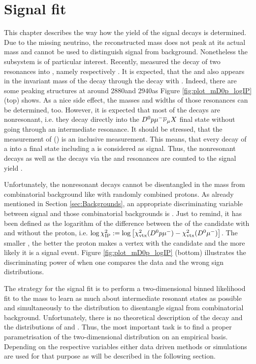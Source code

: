 \chapter{Signal fit}
\label{sec:Signalfit}
This chapter describes the way how the yield \NDp of the signal decays \LbToDpmunuX is determined.
Due to the missing neutrino, the reconstructed \Lb mass does not peak at its actual mass and cannot be used to distinguish signal from background.
Nonetheless the \Dz\proton subsystem is of particular interest.
Recently, \babar measured the decay of two \Lc resonances into \Dz\proton, namely \decay{\LcResI}{\Dz\proton} respectively \decay{\LcResII}{\Dz\proton} \cite{BaBar_D0p}.
It is expected, that the \LcResI and \LcResII also appears in the invariant \Dz\proton mass of the decay \LbToDpmunuX through the decay  with .
Indeed, there are some peaking structures at \MDp around 2880\mev and 2940\mev as Figure \ref{fig:plot_mD0p_logIP} (top) shows.
As a nice side effect, the masses and widths of those resonances can be determined, too.
However, it is expected that most of the \LbToDpmunuX decays are nonresonant, i.e. they decay directly into the ${{D}^0}{p}{\mu^-}{{\overline{\nu}}_\mu} X$ final state without going through an intermediate resonance.
It should be stressed, that the measurement of \BR(\LbToDpmunuX) is an inclusive measurement.
This means, that every decay of a \Lb into a final state including a \Dz\proton\mun\neumb is considered as signal.
Thus, the nonresonant \Lb decays as well as the decays via the \LcResI and \LcResII resonances are counted to the signal yield \NDp.

Unfortunately, the nonresonant \Lb decays cannot be disentangled in the \Dz\proton mass from combinatorial background like \BToDmunuX with randomly combined protons.
As already mentioned in Section \ref{sec:Backgrounds}, an appropriate discriminating variable between signal and those combinatorial backgrounds is \logIP.
Just to remind, it has been defined as the logarithm of the difference between the \chisqvtx of the \Dz\mun candidate with and without the proton, i.e. $\log \chi^2_{\text{IP}} := \log\left[\chi^2_{\rm vtx}({{D}^0}{p}{\mu^-}) - \chi^2_{\rm vtx}({{D}^0}{\mu^-})\right]$.
The smaller \logIP, the better the proton makes a vertex with the \Dz\mun candidate and the more likely it is a \LbToDpmunuX signal event.
Figure \ref{fig:plot_mD0p_logIP} (bottom) illustrates the discriminating power of \logIP when one compares the data and the wrong sign distributions.

The strategy for the signal fit is to perform a two-dimensional binned likelihood fit to the \Dz\proton mass to learn as much about intermediate resonant states as possible and simultaneously to the \logIP distribution to disentangle \LbToDpmunuX signal from combinatorial background.
Unfortunately, there is no theoretical description of the \LbToDpmunuX decay and the distributions of \MDp and \logIP.
Thus, the most important task is to find a proper parametrisation of the two-dimensional distribution on an empirical basis.
Depending on the respective variables either data driven methods or simulations are used for that purpose as will be described in the following section.

